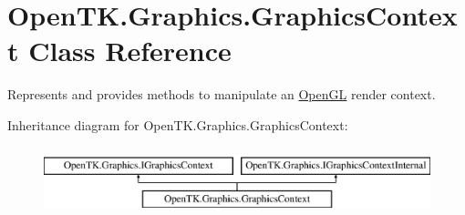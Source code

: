 \hypertarget{class_open_t_k_1_1_graphics_1_1_graphics_context}{\section{Open\-T\-K.\-Graphics.\-Graphics\-Context Class Reference}
\label{class_open_t_k_1_1_graphics_1_1_graphics_context}
}


Represents and provides methods to manipulate an \hyperlink{namespace_open_t_k_1_1_graphics_1_1_open_g_l}{Open\-G\-L} render context.  


Inheritance diagram for Open\-T\-K.\-Graphics.\-Graphics\-Context\-:\begin{figure}[H]
\begin{center}
\leavevmode
\includegraphics[height=2.000000cm]{class_open_t_k_1_1_graphics_1_1_graphics_context}
\end{center}
\end{figure}
